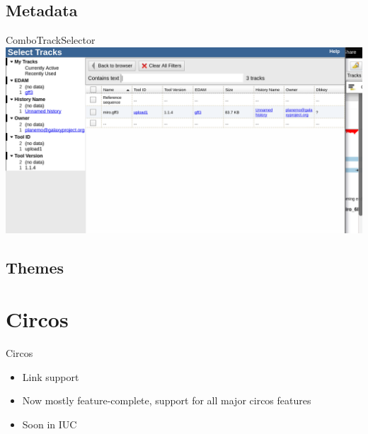 \documentclass[12pt]{phage3slides} %
\begin{document}
\subsection{Metadata}
{
\begin{frame}{ComboTrackSelector}
	\includegraphics[width=\textwidth]{plugin-combo}
\end{frame}
}

\subsection{Themes}
{
  \begin{frame}[plain]
  \end{frame}
}



\section{Circos}
\begin{frame}{Circos}
	\begin{itemize}
		\item Link support
		\item Now mostly feature-complete, support for all major circos features
		\item Soon in IUC
	\end{itemize}
\end{frame}
\end{document}

